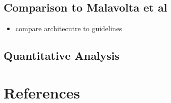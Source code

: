 \documentclass[]{article}
\begin{document}
	\subsection{Comparison to Malavolta et al}
	\begin{itemize}
		\item compare architecutre to guidelines
	\end{itemize}
	\subsection{Quantitative Analysis}
	\section{References}
	\printbibliography
	
\end{document}
